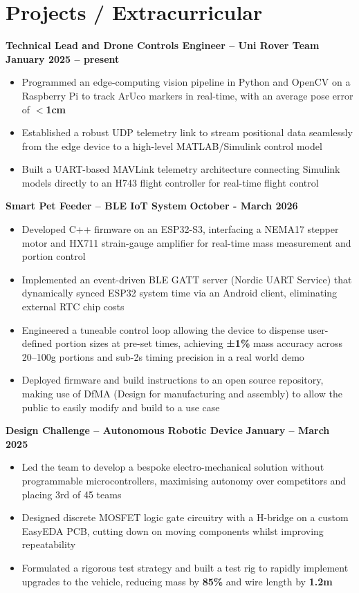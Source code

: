 \documentclass[a4paper,10pt]{article} %
\begin{document}
\section*{Projects / Extracurricular}
\noindent\textbf{Technical Lead and Drone Controls Engineer – Uni Rover Team} \hfill \textbf{January 2025 – present}
\begin{itemize}
    \item Programmed an edge-computing vision pipeline in Python and OpenCV on a Raspberry Pi to track ArUco markers in real-time, with an average pose error of \textbf{$<$1cm}
    \item Established a robust UDP telemetry link to stream positional data seamlessly from the edge device to a high-level MATLAB/Simulink control model
    \item Built a UART-based MAVLink telemetry architecture connecting Simulink models directly to an H743 flight controller for real-time flight control
\end{itemize}
\vspace{0.75em}
\noindent\textbf{Smart Pet Feeder – BLE IoT System} \hfill \textbf{October - March 2026}
\begin{itemize}
    \item Developed C++ firmware on an ESP32-S3, interfacing a NEMA17 stepper motor and HX711 strain-gauge amplifier for real-time mass measurement and portion control   
    \item Implemented an event-driven BLE GATT server (Nordic UART Service) that dynamically synced ESP32 system time via an Android client, eliminating external RTC chip costs
    \item Engineered a tuneable control loop allowing the device to dispense user-defined portion sizes at pre-set times, achieving \textbf{±1\%} mass accuracy across 20–100g portions and sub-2s timing precision in a real world demo
    \item Deployed firmware and build instructions to an open source repository, making use of DfMA (Design for manufacturing and assembly) to allow the public to easily modify and build to a use case
\end{itemize}
\vspace{0.75em}
\noindent\textbf{ Design Challenge – Autonomous Robotic Device} \hfill \textbf{January – March 2025}
\begin{itemize}
    \item Led the team to develop a bespoke electro-mechanical solution without programmable microcontrollers, maximising autonomy over competitors and placing 3rd of 45 teams
    \item Designed discrete MOSFET logic gate circuitry with a H-bridge on a custom EasyEDA PCB, cutting down on moving components whilst improving repeatability
    \item Formulated a rigorous test strategy and built a test rig to rapidly implement upgrades to the vehicle, reducing mass by \textbf{85\%} and wire length by \textbf{1.2m}
\end{itemize}
\end{document}
